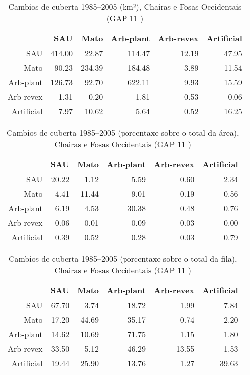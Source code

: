 \clearpage
\begin{table}[p]
\centering
\caption{Cambios de cuberta 1985--2005 (km²), Chairas e Fosas Occidentais (GAP 11 )} 
\label{TaboaContinxGAP11}
\begin{tabular}{rrrrrr}
  \hline
 & SAU & Mato & Arb-plant & Arb-revex & Artificial \\ 
  \hline
SAU & 414.00 & 22.87 & 114.47 & 12.19 & 47.95 \\ 
  Mato & 90.23 & 234.39 & 184.48 & 3.89 & 11.54 \\ 
  Arb-plant & 126.73 & 92.70 & 622.11 & 9.93 & 15.59 \\ 
  Arb-revex & 1.31 & 0.20 & 1.81 & 0.53 & 0.06 \\ 
  Artificial & 7.97 & 10.62 & 5.64 & 0.52 & 16.25 \\ 
   \hline
\end{tabular}
\end{table}
\begin{table}[p]
\centering
\caption{Cambios de cuberta 1985--2005 (porcentaxe sobre o total da área), Chairas e Fosas Occidentais (GAP 11 )} 
\label{TaboaContinxPTGAP11}
\begin{tabular}{rrrrrr}
  \hline
 & SAU & Mato & Arb-plant & Arb-revex & Artificial \\ 
  \hline
SAU & 20.22 & 1.12 & 5.59 & 0.60 & 2.34 \\ 
  Mato & 4.41 & 11.44 & 9.01 & 0.19 & 0.56 \\ 
  Arb-plant & 6.19 & 4.53 & 30.38 & 0.48 & 0.76 \\ 
  Arb-revex & 0.06 & 0.01 & 0.09 & 0.03 & 0.00 \\ 
  Artificial & 0.39 & 0.52 & 0.28 & 0.03 & 0.79 \\ 
   \hline
\end{tabular}
\end{table}
\begin{table}[p]
\centering
\caption{Cambios de cuberta 1985--2005 (porcentaxe sobre o total da fila), Chairas e Fosas Occidentais (GAP 11 )} 
\label{TaboaContinxPFGAP11}
\begin{tabular}{rrrrrr}
  \hline
 & SAU & Mato & Arb-plant & Arb-revex & Artificial \\ 
  \hline
SAU & 67.70 & 3.74 & 18.72 & 1.99 & 7.84 \\ 
  Mato & 17.20 & 44.69 & 35.17 & 0.74 & 2.20 \\ 
  Arb-plant & 14.62 & 10.69 & 71.75 & 1.15 & 1.80 \\ 
  Arb-revex & 33.50 & 5.12 & 46.29 & 13.55 & 1.53 \\ 
  Artificial & 19.44 & 25.90 & 13.76 & 1.27 & 39.63 \\ 
   \hline
\end{tabular}
\end{table}
